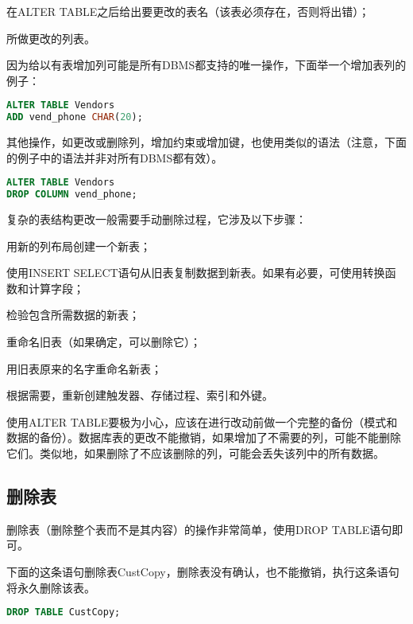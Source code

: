 \begin{compactitem}
\item 在ALTER TABLE之后给出要更改的表名（该表必须存在，否则将出错）；
\item 所做更改的列表。
\end{compactitem}


因为给以有表增加列可能是所有DBMS都支持的唯一操作，下面举一个增加表列的例子：

\begin{lstlisting}[language=SQL]
ALTER TABLE Vendors
ADD vend_phone CHAR(20);
\end{lstlisting}


其他操作，如更改或删除列，增加约束或增加键，也使用类似的语法（注意，下面的例子中的语法并非对所有DBMS都有效）。

\begin{lstlisting}[language=SQL]
ALTER TABLE Vendors
DROP COLUMN vend_phone;
\end{lstlisting}

复杂的表结构更改一般需要手动删除过程，它涉及以下步骤：

\begin{compactenum}
\item 用新的列布局创建一个新表；
\item 使用INSERT SELECT语句从旧表复制数据到新表。如果有必要，可使用转换函数和计算字段；
\item 检验包含所需数据的新表；
\item 重命名旧表（如果确定，可以删除它）；
\item 用旧表原来的名字重命名新表；
\item 根据需要，重新创建触发器、存储过程、索引和外键。
\end{compactenum}


使用ALTER TABLE要极为小心，应该在进行改动前做一个完整的备份（模式和数据的备份）。数据库表的更改不能撤销，如果增加了不需要的列，可能不能删除它们。类似地，如果删除了不应该删除的列，可能会丢失该列中的所有数据。


\subsection{删除表}


删除表（删除整个表而不是其内容）的操作非常简单，使用DROP TABLE语句即可。

下面的这条语句删除表CustCopy，删除表没有确认，也不能撤销，执行这条语句将永久删除该表。

\begin{lstlisting}[language=SQL]
DROP TABLE CustCopy;
\end{lstlisting}


